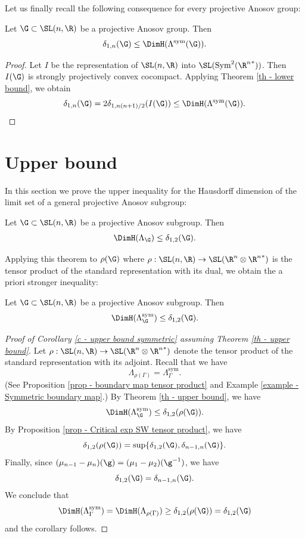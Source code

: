 Let us finally recall the following consequence for every projective Anosov group:
\begin{coro}
Let $\G \subset \SL(n,\R)$ be a projective Anosov group. Then
\[\delta_{1,n}(\G) \leq \DimH(\Lambda^{\mathrm{sym}}(\G)).\]
\end{coro}

\begin{proof}
Let $I$ be the representation of $\SL(n,\R)$ into $\SL(\mathrm{Sym}^2({\R^n}^*))$. Then $I(\G)$ is strongly projectively convex cocompact. Applying Theorem \ref{th - lower bound}, we obtain
\[\delta_{1,n}(\G) = 2 \delta_{1, n(n+1)/2}(I(\G)) \leq \DimH(\Lambda^{\mathrm{sym}}(\G)).\qedhere\]
\end{proof}

\section{Upper bound} \label{sec - upper bound}

In this section we prove the upper inequality for the Hausdorff dimension of the limit set of a general projective Anosov subgroup:

\begin{theorem} \label{th - upper bound}
Let $\G\subset \SL(n,\R)$ be a projective Anosov subgroup. Then
\[\DimH(\Lambda_\G) \leq \delta_{1,2}(\G).\]
\end{theorem}

Applying this theorem to $\rho(\G)$ where $\rho: \SL(n,\R) \to \SL(\R^n \otimes {\R^n}^*)$ is the tensor product of the standard representation with its dual, we obtain the a priori stronger inequality:

\begin{coro} \label{c - upper bound symmetric}
Let $\G\subset \SL(n,\R)$ be a projective Anosov subgroup. Then
\[\DimH(\Lambda^{\mathrm{sym}}_\G) \leq \delta_{1,2}(\G).\]
\end{coro}

\begin{proof}[Proof of Corollary \ref{c - upper bound symmetric} assuming Theorem \ref{th - upper bound}]
Let $\rho: \SL(n,\R) \to \SL(\R^n \otimes {\R^n}^*)$ denote the tensor product of the standard representation with its adjoint. Recall that we have
\[\Lambda_{\rho(\Gamma)}= \Lambda_\Gamma^{\mathrm{sym}}.\]
(See Proposition \ref{prop - boundary map tensor product} and Example \ref{example - Symmetric boundary map}.)
By Theorem \ref{th - upper bound}, we have
\[\DimH(\Lambda^{\mathrm{sym}}_\G) \leq \delta_{1,2}(\rho(\G)).\]
By Proposition \ref{prop - Critical exp SW tensor product}, we have
\[\delta_{1,2}(\rho(\G)) = \sup \{\delta_{1,2}(\G), \delta_{n-1,n}(\G)\}.\] Finally, since $(\mu_{n-1}-\mu_n)(\g) = (\mu_1 - \mu_2)(\g^{-1})$, we have
\[\delta_{1,2}(\G) = \delta_{n-1,n}(\G).\]
We conclude that
\[\DimH(\Lambda_\Gamma^{\mathrm{sym}}) = \DimH(\Lambda_{\rho(\Gamma)}) \geq \delta_{1,2}(\rho(\G)) = \delta_{1,2}(\G)\]
and the corollary follows.
\end{proof}

